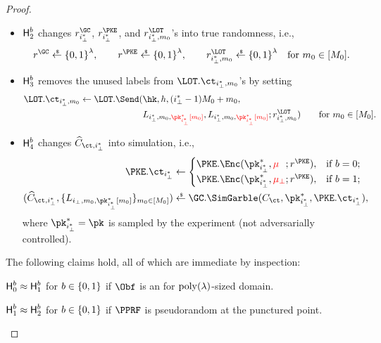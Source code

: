\begin{proof}
\begin{itemize}
\item $\Hyb_2^b$ changes $r^\GC_{i_\bot^\ast}$, $r^\PKE_{i_\bot^\ast}$, and $r^\LOT_{i_\bot^\ast,m_0}$'s into true randomness, i.e.,
\begin{align*}
r^\GC\draws\bit^\lambda,\qquad
r^\PKE\draws\bit^\lambda,\qquad
r^\LOT_{i_\bot^\ast,m_0}\draws\bit^\lambda\quad\textup{for }m_0\in[M_0].
\end{align*}
\item $\Hyb_3^b$ removes the unused labels from $\LOT.\ct_{i_\bot^\ast,m_0}$'s by setting
\begin{align*}
\LOT.\ct_{i_\bot^\ast,m_0}
&{}\gets\LOT.\Send(\hk,h,(i_\bot^\ast-1)M_0+m_0,\\
&\hphantom{{}\gets\LOT.\Send({}}
\WideNarrow{}{\hspace*{-4em}}
L_{i_\bot^\ast,m_0,{\color{red}\pk^\ast_{i_\bot^\ast}[m_0]}},
L_{i_\bot^\ast,m_0,{\color{red}\pk^\ast_{i_\bot^\ast}[m_0]}};
r^\LOT_{i_\bot^\ast,m_0})
\qquad\textup{for }m_0\in[M_0].
\end{align*}
\item $\Hyb_4^b$ changes $\widehat{C}_{\ct,i_\bot^\ast}$ into simulation, i.e.,
\begin{align*}
\PKE.\ct_{i_\bot^\ast}&{}\gets\begin{cases}
\PKE.\Enc(\pk^\ast_{i_\bot^\ast},{\color{red}\mu_{\phantom{\bot}}};r^\PKE),
&\textup{if }b=0;\\
\PKE.\Enc(\pk^\ast_{i_\bot^\ast},{\color{red}\mu_\bot};r^\PKE),
&\textup{if }b=1;
\end{cases}\\
(\widehat{C}_{\ct,i_\bot^\ast},\{L_{i_\bot,m_0,\pk^\ast_{i_\bot^\ast}[m_0]}\}_{m_0\in[M_0]})
&{}\draws\GC.\SimGarble(C_\ct,\pk^\ast_{i_\bot^\ast},\PKE.\ct_{i_\bot^\ast}),
\end{align*}
where ${\pk^\ast_{i_\bot^\ast}=\pk}$ is sampled by the experiment
(not adversarially controlled).
\end{itemize}
The following claims hold, all of which are immediate by inspection:

\begin{claim}\label{clm:index-hiding-hyb01}
${\Hyb_0^b\approx\Hyb_1^b}$ for ${b\in{\{0,1\}}}$
if $\Obf$ is an {\iO} for $\operatorname{poly}(\lambda)$-sized domain.
\end{claim}

\begin{claim}\label{clm:index-hiding-hyb12}
${\Hyb_1^b\approx\Hyb_2^b}$ for ${b\in{\{0,1\}}}$
if $\PPRF$ is pseudorandom at the punctured point.
\end{claim}


\end{proof}
